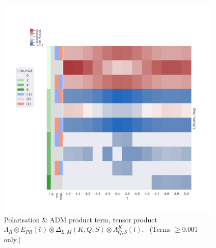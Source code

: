 \documentclass[10pt]{article}
\begin{document}
\begin{figure}[]
\begin{center}
\includegraphics[width=\textwidth,height=\dimexpr\textheight-4\baselineskip-\abovecaptionskip-\belowcaptionskip\relax,keepaspectratio]{figures/basisPlots_090822_polProd_M0.png}
\caption{Polarisation \& ADM product term, tensor product \(\Lambda_{R}\otimes E_{PR}(\hat{e})\otimes\Delta_{L,M}(K,Q,S)\otimes
A^{K}_{Q,S}(t)\).     (Terms \(\ge0.001\) only.)\label{652406}}
\end{center}
\end{figure}
\end{document}
